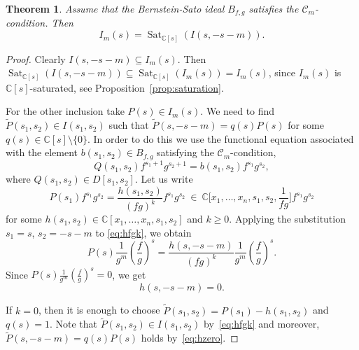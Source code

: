 \documentclass[a4paper,12pt]{amsart}
\theoremstyle{plain}
\newtheorem{theorem}{Theorem}[section]
\theoremstyle{definition}
\theoremstyle{remark}
\def\CC{\mathbb{C}}
\DeclareMathOperator{\Sat}{Sat}
\begin{document}
\begin{theorem}\label{thm:main-theorem}
Assume that the Bernstein-Sato ideal $B_{f,g}$ satisfies the $\mathcal{C}_m$-condition.
Then
\[
I_m(s) = \Sat_{\CC[s]}(I(s,-s-m)).
\]
\end{theorem}

\begin{proof}
Clearly $I(s,-s-m) \subseteq I_m(s)$. Then $\Sat_{\CC[s]}(I(s,-s-m)) \subseteq \Sat_{\CC[s]}(I_m(s)) = I_m(s)$,
since $I_m(s)$ is $\CC[s]$-saturated, see Proposition~\ref{prop:saturation}.

For the other inclusion take $P(s) \in I_m(s)$.
We need to find $\tilde{P}(s_1,s_2) \in I(s_1,s_2)$ such that $\tilde{P}(s,-s-m) = q(s) P(s)$ for some
$q(s) \in \CC[s] \setminus \{0\}$.
In order to do this we use the functional equation associated with the element $b(s_1,s_2) \in B_{f,g}$
satisfying the $\mathcal{C}_m$-condition,
\begin{equation}\label{eq:BSfg}
Q(s_1,s_2) f^{s_1+1} g^{s_2+1} = b(s_1,s_2) f^{s_1} g^{s_2},
\end{equation}
where $Q(s_1,s_2) \in D[s_1,s_2]$. Let us write
\begin{equation}\label{eq:hfgk}
P(s_1) f^{s_1} g^{s_2}
= \frac{h(s_1,s_2)}{(fg)^k} f^{s_1} g^{s_2}
\ \in \ \CC \Big[ x_1,\ldots,x_n,s_1,s_2,\frac{1}{fg} \Big] f^{s_1} g^{s_2}
\end{equation}
for some $h(s_1,s_2) \in \CC[x_1,\ldots,x_n,s_1,s_2]$ and $k \geq 0$.
Applying the substitution $s_1 = s$, $s_2=-s-m$ to \eqref{eq:hfgk}, we obtain
\[
P(s) \frac{1}{g^m} \left( \frac{f}{g} \right)^s
= \frac{h(s,-s-m)}{(fg)^k} \frac{1}{g^m} \left( \frac{f}{g} \right)^s.
\]
Since $P(s) \frac{1}{g^m} \left( \frac{f}{g} \right)^s = 0$,
we get
\begin{equation}\label{eq:hzero}
h(s,-s-m) = 0.
\end{equation}

If $k = 0$, then it is enough to choose $\tilde{P}(s_1,s_2) = P(s_1) - h(s_1,s_2)$ and $q(s)=1$.
Note that $\tilde{P}(s_1,s_2) \in I(s_1,s_2)$ by~\eqref{eq:hfgk} and moreover, $\tilde{P}(s,-s-m) = q(s) P(s)$ holds by~\eqref{eq:hzero}.



\end{proof}
\end{document}
